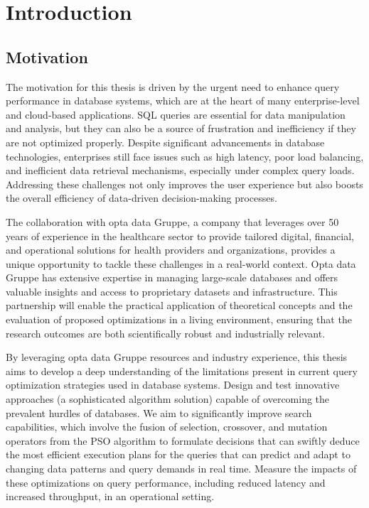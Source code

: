\section{Introduction}
\subsection{Motivation}
The motivation for this thesis is driven by the urgent need to enhance query performance in database systems, which are at the heart of many enterprise-level and cloud-based applications. SQL queries are essential for data manipulation and analysis, but they can also be a source of frustration and inefficiency if they are not optimized properly. Despite significant advancements in database technologies, enterprises still face issues such as high latency, poor load balancing, and inefficient data retrieval mechanisms, especially under complex query loads. Addressing these challenges not only improves the user experience but also boosts the overall efficiency of data-driven decision-making processes.\vspace{.4cm}

The collaboration with opta data Gruppe, a company that leverages over 50 years of experience in the healthcare sector to provide tailored digital, financial, and operational solutions for health providers and organizations, provides a unique opportunity to tackle these challenges in a real-world context. Opta data Gruppe has extensive expertise in managing large-scale databases and offers valuable insights and access to proprietary datasets and infrastructure. This partnership will enable the practical application of theoretical concepts and the evaluation of proposed optimizations in a living environment, ensuring that the research outcomes are both scientifically robust and industrially relevant. \vspace{.4cm}

By leveraging opta data Gruppe resources and industry experience, this thesis aims to develop a deep understanding of the limitations present in current query optimization strategies used in database systems. Design and test innovative approaches (a sophisticated algorithm solution) capable of overcoming the prevalent hurdles of databases. We aim to significantly improve search capabilities, which involve the fusion of selection, crossover, and mutation operators from the PSO algorithm to formulate decisions that can swiftly deduce the most efficient execution plans for the queries that can predict and adapt to changing data patterns and query demands in real time. Measure the impacts of these optimizations on query performance, including reduced latency and increased throughput, in an operational setting.

